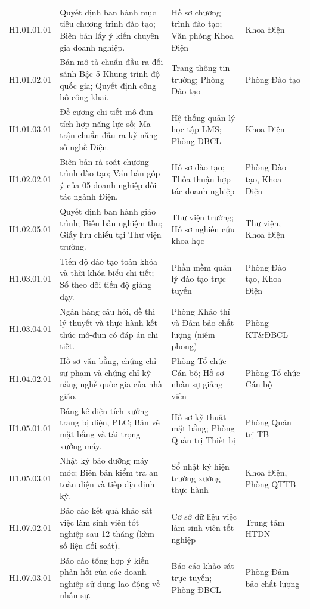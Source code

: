 \begin{footnotesize}
\begin{longtable}{>{\raggedright\arraybackslash\ttfamily}p{2.3cm} >{\raggedright\arraybackslash}p{5.5cm} >{\raggedright\arraybackslash}p{4.4cm} >{\raggedright\arraybackslash}p{2.2cm}}
H1.01.01.01 & Quyết định ban hành mục tiêu chương trình đào tạo; Biên bản lấy ý kiến chuyên gia doanh nghiệp. & Hồ sơ chương trình đào tạo; Văn phòng Khoa Điện & Khoa Điện \\
H1.01.02.01 & Bản mô tả chuẩn đầu ra đối sánh Bậc 5 Khung trình độ quốc gia; Quyết định công bố công khai. & Trang thông tin trường; Phòng Đào tạo & Phòng Đào tạo \\
H1.01.03.01 & Đề cương chi tiết mô-đun tích hợp năng lực số; Ma trận chuẩn đầu ra kỹ năng số nghề Điện. & Hệ thống quản lý học tập LMS; Phòng ĐBCL & Khoa Điện \\
H1.02.02.01 & Biên bản rà soát chương trình đào tạo; Văn bản góp ý của 05 doanh nghiệp đối tác ngành Điện. & Hồ sơ đào tạo; Thỏa thuận hợp tác doanh nghiệp & Phòng Đào tạo, Khoa Điện \\
H1.02.05.01 & Quyết định ban hành giáo trình; Biên bản nghiệm thu; Giấy lưu chiểu tại Thư viện trường. & Thư viện trường; Hồ sơ nghiên cứu khoa học & Thư viện, Khoa Điện \\
H1.03.01.01 & Tiến độ đào tạo toàn khóa và thời khóa biểu chi tiết; Sổ theo dõi tiến độ giảng dạy. & Phần mềm quản lý đào tạo trực tuyến & Phòng Đào tạo, Khoa Điện \\
H1.03.04.01 & Ngân hàng câu hỏi, đề thi lý thuyết và thực hành kết thúc mô-đun có đáp án chi tiết. & Phòng Khảo thí và Đảm bảo chất lượng (niêm phong) & Phòng KT\&ĐBCL \\
H1.04.02.01 & Hồ sơ văn bằng, chứng chỉ sư phạm và chứng chỉ kỹ năng nghề quốc gia của nhà giáo. & Phòng Tổ chức Cán bộ; Hồ sơ nhân sự giảng viên & Phòng Tổ chức Cán bộ \\
H1.05.01.01 & Bảng kê diện tích xưởng trang bị điện, PLC; Bản vẽ mặt bằng và tải trọng xưởng máy. & Hồ sơ kỹ thuật mặt bằng; Phòng Quản trị Thiết bị & Phòng Quản trị TB \\
H1.05.03.01 & Nhật ký bảo dưỡng máy móc; Biên bản kiểm tra an toàn điện và tiếp địa định kỳ. & Sổ nhật ký hiện trường xưởng thực hành & Khoa Điện, Phòng QTTB \\
H1.07.02.01 & Báo cáo kết quả khảo sát việc làm sinh viên tốt nghiệp sau 12 tháng (kèm số liệu đối soát). & Cơ sở dữ liệu việc làm sinh viên tốt nghiệp & Trung tâm HTDN \\
H1.07.03.01 & Báo cáo tổng hợp ý kiến phản hồi của các doanh nghiệp sử dụng lao động về nhân sự. & Báo cáo khảo sát trực tuyến; Phòng ĐBCL & Phòng Đảm bảo chất lượng \\
\end{longtable}
\end{footnotesize}

